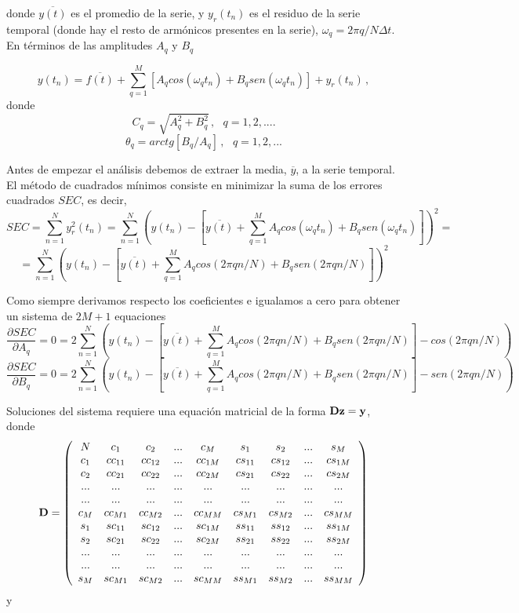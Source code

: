 \documentclass[
]{agujournal2019}
\begin{document}
donde \(\overline{y(t)}\) es el promedio de la serie, y \(y_r(t_n)\) es
el residuo de la serie temporal (donde hay el resto de armónicos
presentes en la serie), \(\omega_q=2\pi q/N\Delta t\). En términos de
las amplitudes \(A_q\) y \(B_q\)

\[y(t_n) = \overline{f(t)} + \sum\limits^{M}_{q=1}[A_q cos(\omega_q t_n)+B_q sen(\omega_q t_n)] +y_r(t_n)\,,\]
donde \[C_q=\sqrt{A_q^2+B_q^2}\,,\,\,\,\,q=1,2,....\]
\[\theta_q=arctg[B_q/A_q]\,,\,\,\,\,q=1,2,...\]

Antes de empezar el análisis debemos de extraer la media,
\(\overline{y}\), a la serie temporal. El método de cuadrados mínimos
consiste en minimizar la suma de los errores cuadrados \(SEC\), es
decir,
\[SEC= \sum\limits^N_{n=1} y_r^2(t_n) = \sum\limits^N_{n=1}  \left( y(t_n) - \left[ \overline{y(t)} +
 \sum\limits^{M}_{q=1} A_q cos(\omega_q t_n)+B_q sen(\omega_q t_n) \right] \right)^2 =\]
\[=\sum\limits^N_{n=1}  \left(y(t_n) - \left[ \overline{y(t)} +
\sum\limits^{M}_{q=1} A_q cos(2\pi q n/ N)+B_q sen(2\pi q n/ N) \right] \right)^2\]

Como siempre derivamos respecto los coeficientes e igualamos a cero para
obtener un sistema de \(2M+1\) equaciones
\[\frac{\partial{SEC}}{\partial{A_q}}=0=2\sum\limits^N_{n=1} \left(y(t_n) - \left[ \overline{y(t)} +
\sum\limits^{M}_{q=1} A_q cos(2\pi q n/ N)+B_q sen(2\pi q n/ N) \right]-cos(2\pi q n/ N) \right)\]
\[\frac{\partial{SEC}}{\partial{B_q}}=0=2\sum\limits^N_{n=1} \left(y(t_n) - \left[ \overline{y(t)} +
\sum\limits^{M}_{q=1} A_q cos(2\pi q n/ N)+B_q sen(2\pi q n/ N) \right]-sen(2\pi q n/ N) \right)\]

Soluciones del sistema requiere una equación matricial de la forma
\({\textbf D}{\textbf z}={\textbf y}\), donde
\[{\textbf D}=\left( \begin{array}{cccccccccccccc}
  N & c_1 & c_2 & ... & c_M & s_1 & s_2 & ... & s_M \\
  c_1 & cc_{11} & cc_{12} & ... & cc_{1M} & cs_{11} & cs_{12} & ... & cs_{1M} \\
  c_2 & cc_{21} & cc_{22} & ... & cc_{2M} & cs_{21} & cs_{22} & ... & cs_{2M} \\
  ... & ... & ... & ... & ... & ... & ... & ... & ... \\
  ... & ... & ... & ... & ... & ... & ... & ... & ... \\
  c_M & cc_{M1} & cc_{M2} & ... & cc_{MM} & cs_{M1} & cs_{M2} & ... & cs_{MM} \\
  s_1 & sc_{11} & sc_{12} & ... & sc_{1M} & ss_{11} & ss_{12} & ... & ss_{1M} \\
  s_2 & sc_{21} & sc_{22} & ... & sc_{2M} & ss_{21} & ss_{22} & ... & ss_{2M} \\
  ... & ... & ... & ... & ... & ... & ... & ... & ... \\
  ... & ... & ... & ... & ... & ... & ... & ... & ... \\
  s_M & sc_{M1} & sc_{M2} & ... & sc_{MM} & ss_{M1} & ss_{M2} & ... & ss_{MM} \\
      \end{array} \right)\] y
\end{document}

